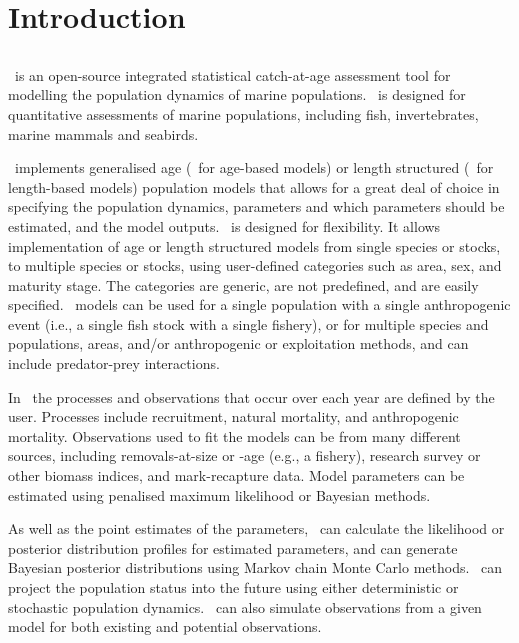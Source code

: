 \section{Introduction\label{sec:Introduction}}

\subsection{}

\CNAME\ is an open-source integrated statistical catch-at-age assessment tool for modelling the population dynamics of marine populations. \CNAME\ is designed for quantitative assessments of marine populations, including fish, invertebrates, marine mammals and seabirds.

\CNAME\ implements generalised age (\CNAME\ for age-based models) or length structured (\CNAME\ for length-based models) population models that allows for a great deal of choice in specifying the population dynamics, parameters and which parameters should be estimated, and the model outputs. \CNAME\ is designed for flexibility. It allows implementation of age or length structured models from single species or stocks, to multiple species or stocks, using user-defined categories such as area, sex, and maturity stage. The categories are generic, are not predefined, and are easily specified. \CNAME\ models can be used for a single population with a single anthropogenic event (i.e., a single fish stock with a single fishery), or for multiple species and populations, areas, and/or anthropogenic or exploitation methods, and can include predator-prey interactions.

In \CNAME\ the processes and observations that occur over each year are defined by the user. Processes include recruitment, natural mortality, and anthropogenic mortality. Observations used to fit the models can be from many different sources, including removals-at-size or -age (e.g., a fishery), research survey or other biomass indices, and mark-recapture data. Model parameters can be estimated using penalised maximum likelihood or Bayesian methods.

As well as the point estimates of the parameters, \CNAME\ can calculate the likelihood or posterior distribution profiles for estimated parameters, and can generate Bayesian posterior distributions using Markov chain Monte Carlo methods. \CNAME\ can project the population status into the future using either deterministic or stochastic population dynamics. \CNAME\ can also simulate observations from a given model for both existing and potential observations.


